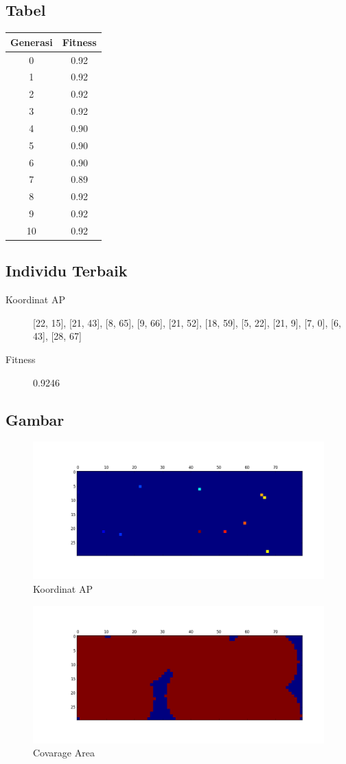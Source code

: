 \documentclass[11pt,a4paper,titlepage]{report}
\begin{document}
	\subsection*{Tabel}
	\begin{tabular}{|c|c|}
		\hline Generasi & Fitness \\ 
		\hline 0 & 0.92 \\ 
		\hline 1 & 0.92 \\ 
		\hline 2 & 0.92 \\ 
		\hline 3 & 0.92 \\ 
		\hline 4 & 0.90 \\ 
		\hline 5 & 0.90 \\ 
		\hline 6 & 0.90 \\ 
		\hline 7 & 0.89 \\ 
		\hline 8 & 0.92 \\ 
		\hline 9 & 0.92 \\ 
		\hline 10 & 0.92 \\
		\hline
	\end{tabular} 
	\subsection*{Individu Terbaik}
	\begin{description}
		\item[Koordinat AP] [22, 15], [21, 43], [8, 65], [9, 66], [21, 52], [18, 59], [5, 22], [21, 9], [7, 0], [6, 43], [28, 67]
		\item[Fitness] 0.9246
	\end{description}
	\newpage
	\subsection*{Gambar}
	\begin{figure}[h]
		\centering
		\includegraphics[width=0.9\linewidth]{apLoc_03}
		\caption{Koordinat AP}
		\label{fig:apLoc_03}
	\end{figure}
	\begin{figure}[h]
		\centering
		\includegraphics[width=0.9\linewidth]{coverage_03}
		\caption{Covarage Area}
		\label{fig:coverage_03}
	\end{figure}
	\newpage
\end{document}

